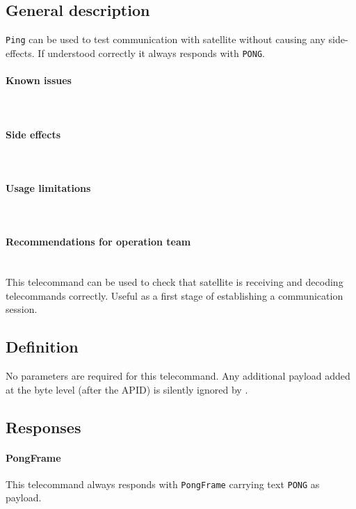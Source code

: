 

\subsection{General description}
\texttt{Ping} can be used to test communication with satellite without causing any side-effects. If understood correctly it always responds with \texttt{PONG}.

\paragraph{Known issues} \mbox{} \\
\None

\paragraph{Side effects} \mbox{} \\
\None

\paragraph{Usage limitations} \mbox{} \\
\None

\paragraph{Recommendations for operation team} \mbox{} \\
This telecommand can be used to check that satellite is receiving and decoding telecommands correctly. Useful as a first stage of establishing a communication session.

\subsection{Definition}

No parameters are required for this telecommand. Any additional payload added at the byte level (after the APID) is silently ignored by \OBC.

\subsection{Responses}

\paragraph{PongFrame}
This telecommand always responds with \texttt{PongFrame} carrying text \texttt{PONG} as payload.
